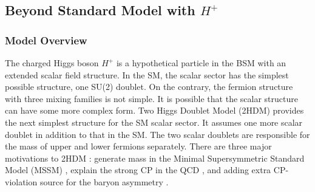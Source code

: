 








\subsection{Beyond Standard Model with $H^+$}
\label{sec:relatedWorks:bsm:chargedHiggs}

\subsubsection{Model Overview}
The charged Higgs boson $H^+$ is a hypothetical particle in the BSM with an extended scalar field structure. In the SM, the scalar sector has the simplest possible structure, one SU(2) doublet. On the contrary, the fermion structure with three mixing families is not simple. It is possible that the scalar structure can have some more complex form. Two Higgs Doublet Model (2HDM) provides the next simplest structure for the SM scalar sector. It assumes one more scalar doublet in addition to that in the SM. The two scalar doublets are responsible for the mass of upper and lower fermions separately. There are three major motivations to 2HDM \cite{BRANCO20121}: generate mass in the Minimal Supersymmetric Standard Model (MSSM) \cite{HABER198575}, explain the strong CP in the QCD \cite{KIM19871, PhysRevLett.38.1440}, and adding extra CP-violation source for the baryon asymmetry \cite{Trodden:1998qg, TUROK1991471, Joyce:1994zt}. 

